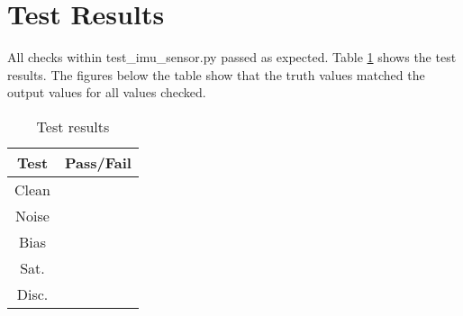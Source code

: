 \section{Test Results}
All checks within test\_imu\_sensor.py passed as expected. Table \ref{tab:results} shows the test results. The figures below the table show that the truth values matched the output values for all values checked.

\begin{table}[H]
	\caption{Test results}
	\label{tab:results}
	\centering \fontsize{10}{10}\selectfont
	\begin{tabular}{c | c  } %
		\hline
		\textbf{Test} 						  		&\textbf{Pass/Fail} \\ \hline
		Clean	   			&  \\ \hline
		Noise	   			&  \\ \hline
		Bias	   			&  \\ \hline
		Sat.	   			&  \\ \hline
		Disc.	   			&  \\ \hline
	\end{tabular}
\end{table}







\clearpage






\clearpage






\clearpage






\clearpage






\clearpage






\pagebreak %